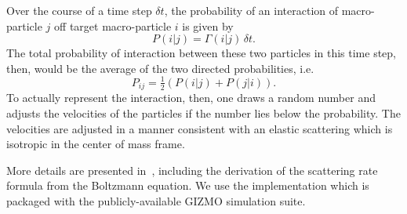Over the course of a time step \(\delta t\), the probability of an
interaction of macro-particle \(j\) off target macro-particle \(i\) is
given by 
\begin{equation}
P(i|j) = \Gamma(i|j) \, \delta t.
\end{equation}
The total probability
of interaction between these two particles in this time step, then,
would be the average of the two directed probabilities, i.e.
\begin{equation}
P_{ij} = \tfrac{1}{2} \left( P(i|j) + P(j|i) \right).
\end{equation}
To actually
represent the interaction, then, one draws a random number and adjusts
the velocities of the particles if the number lies below the
probability. The velocities are adjusted in a manner consistent with an
elastic scattering which is isotropic in the center of mass frame.

More details are presented in~\cite{rocha_cosmological_2013}, including the
derivation of the scattering rate formula from the Boltzmann equation. We use
the implementation which is packaged with the publicly-available GIZMO
simulation suite.

